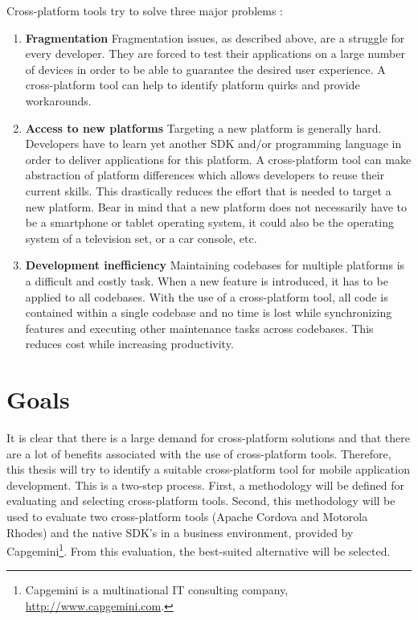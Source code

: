 Cross-platform tools try to solve three major problems \cite{VMCPT:2012}: 

\begin{enumerate}
    \item \textbf{Fragmentation} Fragmentation issues, as described above, are a struggle for every developer. They are forced to test their applications on a large number of devices in order to be able to guarantee the desired user experience. A cross-platform tool can help to identify platform quirks and provide workarounds. 
    \item \textbf{Access to new platforms} Targeting a new platform is generally hard. Developers have to learn yet another SDK and/or programming language in order to deliver applications for this platform. A cross-platform tool can make abstraction of platform differences which allows developers to reuse their current skills. This drastically reduces the effort that is needed to target a new platform. Bear in mind that a new platform does not necessarily have to be a smartphone or tablet operating system, it could also be the operating system of a television set, or a car console, etc.
    \item \textbf{Development inefficiency} Maintaining codebases for multiple platforms is a difficult and costly task. When a new feature is introduced, it has to be applied to all codebases. With the use of a cross-platform tool, all code is contained within a single codebase and no time is lost while synchronizing features and executing other maintenance tasks across codebases. This reduces cost while increasing productivity. 
\end{enumerate}

\section{Goals}

It is clear that there is a large demand for cross-platform solutions and that there are a lot of benefits associated with the use of cross-platform tools. Therefore, this thesis will try to identify a suitable cross-platform tool for mobile application development. This is a two-step process. First, a methodology will be defined for evaluating and selecting cross-platform tools. Second, this methodology will be used to evaluate two cross-platform tools (Apache Cordova and Motorola Rhodes) and the native SDK's in a business environment, provided by Capgemini\footnote{Capgemini is a multinational IT consulting company, \url{http://www.capgemini.com}.}. From this evaluation, the best-suited alternative will be selected. 